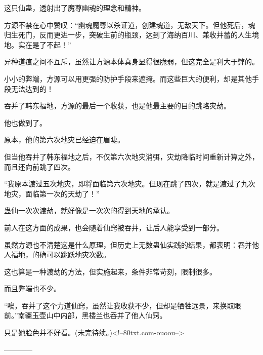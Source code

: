 \begin{this_body}
这只仙蛊，透射出了魔尊幽魂的理念和精神。

方源不禁在心中赞叹：“幽魂魔尊以杀证道，创建魂道，无敌天下。但他死后，魂归生死门，反而更进一步，突破生前的瓶颈，达到了海纳百川、兼收并蓄的人生境地。实在是了不起！”

异种道痕之间不互斥，虽然让方源本体真身显得很脆弱，但这完全是利大于弊的。

小小的弊端，方源可以用更强的防护手段来遮掩。而这些巨大的便利，却是其他手段无法达到的！

吞并了韩东福地，方源的最后一个收获，也是他最主要的目的跳略灾劫。

他也做到了。

原本，他的第六次地灾已经迫在眉睫。

但当他吞并了韩东福地之后，不仅第六次地灾消弭，灾劫降临时间重新计算之外，而且还向前跳了四次。

“我原本渡过五次地灾，即将面临第六次地灾。但现在跳了四次，就是渡过了九次地灾，面临第一次的天劫了！”

蛊仙一次次渡劫，就好像是一次次的得到天地的承认。

前人在这方面的成果，也会随着仙窍被吞并，让后人能享受到一部分。

虽然方源也不清楚这是什么原理，但历史上无数蛊仙实践的结果，都表明：吞并他人福地，的确可以跳跃地灾次数。

这也算是一种渡劫的方法，但实施起来，条件非常苛刻，限制很多。

而且弊端也不少。

“唉，吞并了这个力道仙窍，虽然让我收获不少，但却是牺牲远景，来换取眼前。”南疆玉壶山中内部，黑楼兰也吞并了他人仙窍。

只是她脸色并不好看。(未完待续。)<!--80txt.com-ouoou-->

------------

\end{this_body}

